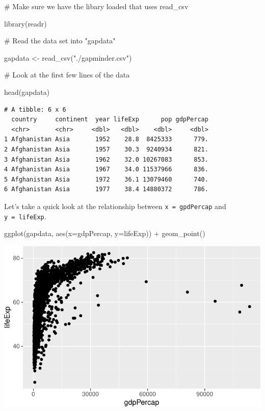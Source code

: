 \documentclass[
  letterpaper,
  DIV=11,
  numbers=noendperiod]{scrreprt}
\newenvironment{Shaded}{\begin{snugshade}}{\end{snugshade}}
\newcommand{\AttributeTok}[1]{\textcolor[rgb]{0.40,0.45,0.13}{#1}}
\newcommand{\CommentTok}[1]{\textcolor[rgb]{0.37,0.37,0.37}{#1}}
\newcommand{\FunctionTok}[1]{\textcolor[rgb]{0.28,0.35,0.67}{#1}}
\newcommand{\NormalTok}[1]{\textcolor[rgb]{0.00,0.23,0.31}{#1}}
\newcommand{\OtherTok}[1]{\textcolor[rgb]{0.00,0.23,0.31}{#1}}
\newcommand{\SpecialCharTok}[1]{\textcolor[rgb]{0.37,0.37,0.37}{#1}}
\newcommand{\StringTok}[1]{\textcolor[rgb]{0.13,0.47,0.30}{#1}}
\begin{document}
\begin{Shaded}
\begin{Highlighting}[]
\CommentTok{\# Make sure we have the libary loaded that uses read\_csv}

\FunctionTok{library}\NormalTok{(readr)}

\CommentTok{\# Read the data set into "gapdata"}

\NormalTok{gapdata }\OtherTok{\textless{}{-}} \FunctionTok{read\_csv}\NormalTok{(}\StringTok{"./gapminder.csv"}\NormalTok{)}

\CommentTok{\# Look at the first few lines of the data}

\FunctionTok{head}\NormalTok{(gapdata)}
\end{Highlighting}
\end{Shaded}

\begin{verbatim}
# A tibble: 6 x 6
  country     continent  year lifeExp      pop gdpPercap
  <chr>       <chr>     <dbl>   <dbl>    <dbl>     <dbl>
1 Afghanistan Asia       1952    28.8  8425333      779.
2 Afghanistan Asia       1957    30.3  9240934      821.
3 Afghanistan Asia       1962    32.0 10267083      853.
4 Afghanistan Asia       1967    34.0 11537966      836.
5 Afghanistan Asia       1972    36.1 13079460      740.
6 Afghanistan Asia       1977    38.4 14880372      786.
\end{verbatim}

Let's take a quick look at the relationship between
\texttt{x\ =\ gpdPercap} and \texttt{y\ =\ lifeExp}.

\begin{Shaded}
\begin{Highlighting}[]
\FunctionTok{ggplot}\NormalTok{(gapdata, }\FunctionTok{aes}\NormalTok{(}\AttributeTok{x=}\NormalTok{gdpPercap, }\AttributeTok{y=}\NormalTok{lifeExp)) }\SpecialCharTok{+}
  \FunctionTok{geom\_point}\NormalTok{()}
\end{Highlighting}
\end{Shaded}

\includegraphics{Advanced_Scatterplot_Techniques_files/figure-pdf/unnamed-chunk-14-1.pdf}
\end{document}

